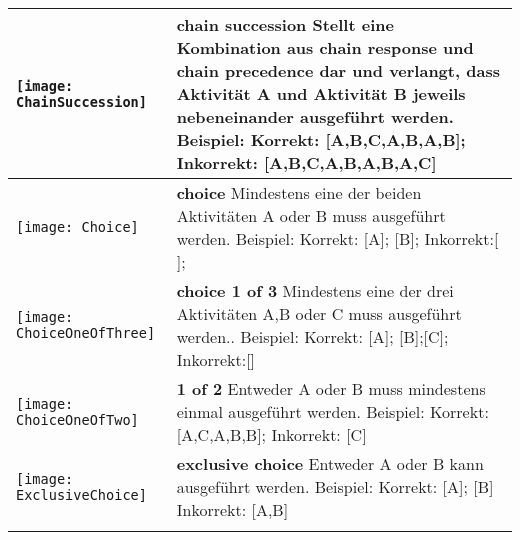 \begin{longtable}{|p{}|p{}|}
\begin{center}
  \texttt{[image: ChainSuccession]} %
    \end{center} &
\textbf{chain succession} \newline  Stellt eine Kombination aus chain response und chain precedence dar und verlangt, dass Aktivität A und Aktivität B jeweils nebeneinander ausgeführt werden. \newline
Beispiel: Korrekt: [A,B,C,A,B,A,B]; Inkorrekt: [A,B,C,A,B,A,B,A,C]\\
\hline
 
\begin{center}

  \texttt{[image: Choice]} %
    \end{center}&

\textbf{choice} \newline  Mindestens eine der beiden Aktivitäten A oder B muss ausgeführt werden.  \newline
Beispiel: Korrekt: [A]; [B]; Inkorrekt:[ ];
\\
\hline

\begin{center}
  \texttt{[image: ChoiceOneOfThree]} %
    \end{center} &
    \textbf{choice 1 of 3}\newline
Mindestens eine der drei Aktivitäten A,B oder C muss ausgeführt werden.. \newline
Beispiel: Korrekt: [A]; [B];[C]; Inkorrekt:[]
\\
\hline
\begin{center}

  \texttt{[image: ChoiceOneOfTwo]} %
    \end{center}&
\textbf{1 of 2} \newline Entweder A oder B muss mindestens einmal ausgeführt werden.\newline
Beispiel: Korrekt: [A,C,A,B,B]; Inkorrekt: [C]\\
\hline

\begin{center}

  \texttt{[image: ExclusiveChoice]} %
    \end{center} &
\textbf{exclusive choice}\newline
  Entweder A oder B kann ausgeführt werden. \newline
  Beispiel:  Korrekt: [A]; [B] Inkorrekt: [A,B] \\
\hline
\begin{center}


\end{center}
\end{longtable}
